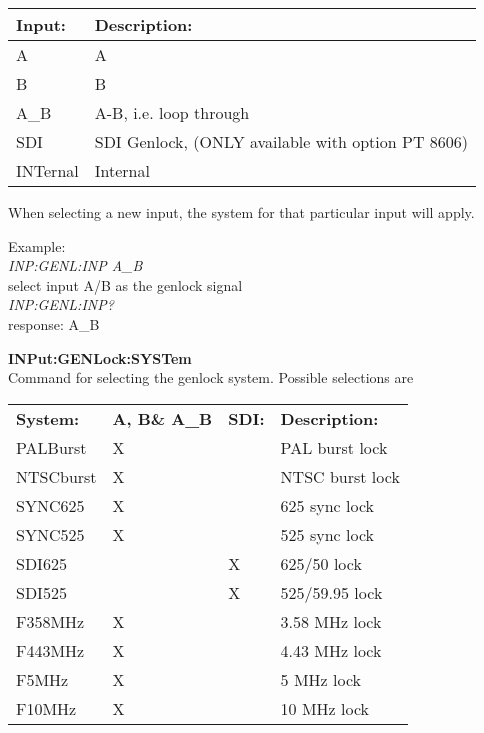 \begin{tabular}{|l|l|}
\hline
\textbf{Input:} & \textbf{Description:} \\ \hline
A & A \\ \hline
B & B \\ \hline
A\_B & A-B, i.e. loop through \\ \hline
SDI & SDI Genlock, (ONLY available with option PT 8606)\\ \hline
INTernal & Internal\\ 
\hline
\end{tabular}

When selecting a new input, the system for that particular input will apply.

Example:\\
\textit{INP:GENL:INP A\_B}\\
select input A/B as the genlock signal\\
\textit{INP:GENL:INP?}\\
response: A\_B

\textbf{INPut:GENLock:SYSTem}\\
Command for selecting the genlock system. Possible selections are 

\begin{tabular}{|l|l|l|l|}
\hline
\textbf{System:} 	& \textbf{A, B\& A\_B} & \textbf{SDI:} & \textbf{Description:} \\
PALBurst					& X 									&								&	PAL burst lock 		\\ \hline
NTSCburst					& X 									&								& NTSC burst lock		\\ \hline
SYNC625						& X										& 							& 625 sync lock			\\ \hline
SYNC525						& X										&								& 525 sync lock			\\ \hline
SDI625						&											& X							& 625/50 lock				\\ \hline
SDI525						&											& X							& 525/59.95 lock		\\ \hline
F358MHz						& X										&								& 3.58 MHz lock			\\ \hline
F443MHz						& X										& 							& 4.43 MHz lock			\\ \hline
F5MHz							& X										&								& 5 MHz lock				\\ \hline
F10MHz						& X										&								& 10 MHz lock				\\ \hline
\end{tabular}

